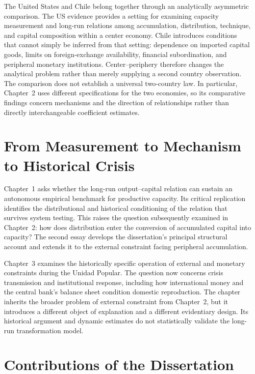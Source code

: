 The United States and Chile belong together through an analytically asymmetric comparison. The US evidence provides a setting for examining capacity measurement and long-run relations among accumulation, distribution, technique, and capital composition within a center economy. Chile introduces conditions that cannot simply be inferred from that setting: dependence on imported capital goods, limits on foreign-exchange availability, financial subordination, and peripheral monetary institutions. Center--periphery therefore changes the analytical problem rather than merely supplying a second country observation. The comparison does not establish a universal two-country law. In particular, Chapter~2 uses different specifications for the two economies, so its comparative findings concern mechanisms and the direction of relationships rather than directly interchangeable coefficient estimates.

\section*{From Measurement to Mechanism to Historical Crisis}

Chapter~1 asks whether the long-run output--capital relation can sustain an autonomous empirical benchmark for productive capacity. Its critical replication identifies the distributional and historical conditioning of the relation that survives system testing. This raises the question subsequently examined in Chapter~2: how does distribution enter the conversion of accumulated capital into capacity? The second essay develops the dissertation's principal structural account and extends it to the external constraint facing peripheral accumulation.

Chapter~3 examines the historically specific operation of external and monetary constraints during the Unidad Popular. The question now concerns crisis transmission and institutional response, including how international money and the central bank's balance sheet condition domestic reproduction. The chapter inherits the broader problem of external constraint from Chapter~2, but it introduces a different object of explanation and a different evidentiary design. Its historical argument and dynamic estimates do not statistically validate the long-run transformation model.

\section*{Contributions of the Dissertation}

